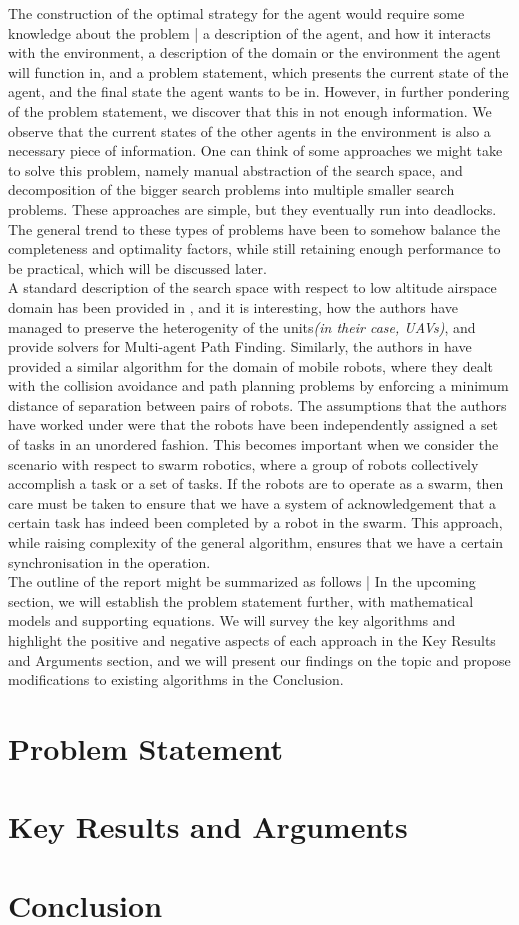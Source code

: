 The construction of the optimal strategy for the agent would require some knowledge about the problem | a description of the agent, and how it interacts with the environment, a description of the domain or the environment the agent will function in, and a problem statement, which presents the current state of the agent, and the final state the agent wants to be in. However, in further pondering of the problem statement, we discover that this in not enough information. We observe that the current states of the other agents in the environment is also a necessary piece of information. One can think of some approaches we might take to solve this problem, namely manual abstraction of the search space, and decomposition of the bigger search problems into multiple smaller search problems. These approaches are simple, but they eventually run into deadlocks. The general trend to these types of problems have been to somehow balance the completeness and optimality factors, while still retaining enough performance to be practical, which will be discussed later.\\

A standard description of the search space with respect to low altitude airspace domain has been provided in \cite{ho2019multi}, and it is interesting, how the authors have managed to preserve the heterogenity of the units\textit{(in their case, UAVs)}, and provide solvers for Multi-agent Path Finding. Similarly, the authors in \cite{bhattacharya2010multi} have provided a similar algorithm for the domain of mobile robots, where they dealt with the collision avoidance and path planning problems by enforcing a minimum distance of separation between pairs of robots. The assumptions that the authors have worked under were that the robots have been independently assigned a set of tasks in an unordered fashion. This becomes important when we consider the scenario with respect to swarm robotics, where a group of robots collectively accomplish a task or a set of tasks. If the robots are to operate as a swarm, then care must be taken to ensure that we have a system of acknowledgement that a certain task has indeed been completed by a robot in the swarm. This approach, while raising complexity of the general algorithm, ensures that we have a certain synchronisation in the operation.\\

The outline of the report might be summarized as follows | In the upcoming section, we will establish the problem statement further, with mathematical models and supporting equations. We will survey the key algorithms and highlight the positive and negative aspects of each approach in the Key Results and Arguments section, and we will present our findings on the topic and propose modifications to existing algorithms in the Conclusion.
\section{Problem Statement}

\section{Key Results and Arguments}

\section{Conclusion}





